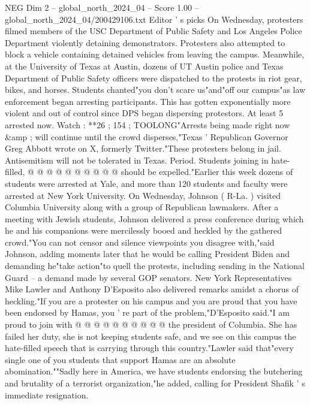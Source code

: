 \begin{textsample}{NEG Dim 2 – global\_north\_2024\_04 – Score 1.00 – global\_north\_2024\_04/200429106.txt}
Editor ' s picks On Wednesday, protesters filmed members of the USC Department of Public Safety and Los Angeles Police Department violently detaining demonstrators.
Protesters also attempted to block a vehicle containing detained vehicles from leaving the campus.
Meanwhile, at the University of Texas at Austin, dozens of UT Austin police and Texas Department of Public Safety officers were dispatched to the protests in riot gear, bikes, and horses.
Students chanted"you don't scare us"and"off our campus"as law enforcement began arresting participants.
This has gotten exponentially more violent and out of control since DPS began dispersing protestors.
At least 5 arrested now.
Watch : **26 ; 154 ; TOOLONG"Arrests being made right now \&amp ; will continue until the crowd disperses,"Texas ' Republican Governor Greg Abbott wrote on X, formerly Twitter."These protesters belong in jail.
Antisemitism will not be tolerated in Texas.
Period.
Students joining in hate-filled, @ @ @ @ @ @ @ @ @ @ should be expelled."Earlier this week dozens of students were arrested at Yale, and more than 120 students and faculty were arrested at New York University.
On Wednesday, Johnson ( R-La. ) visited Columbia University along with a group of Republican lawmakers.
After a meeting with Jewish students, Johnson delivered a press conference during which he and his companions were mercilessly booed and heckled by the gathered crowd."You can not censor and silence viewpoints you disagree with,"said Johnson, adding moments later that he would be calling President Biden and demanding he"take action"to quell the protests, including sending in the National Guard -- a demand made by several GOP senators.
New York Representatives Mike Lawler and Anthony D'Esposito also delivered remarks amidst a chorus of heckling."If you are a protester on his campus and you are proud that you have been endorsed by Hamas, you ' re part of the problem,"D'Esposito said."I am proud to join with @ @ @ @ @ @ @ @ @ @ the president of Columbia.
She has failed her duty, she is not keeping students safe, and we see on this campus the hate-filled speech that is carrying through this country."Lawler said that"every single one of you students that support Hamas are an absolute abomination.""Sadly here in America, we have students endorsing the butchering and brutality of a terrorist organization,"he added, calling for President Shafik ' s immediate resignation.

\end{textsample}

